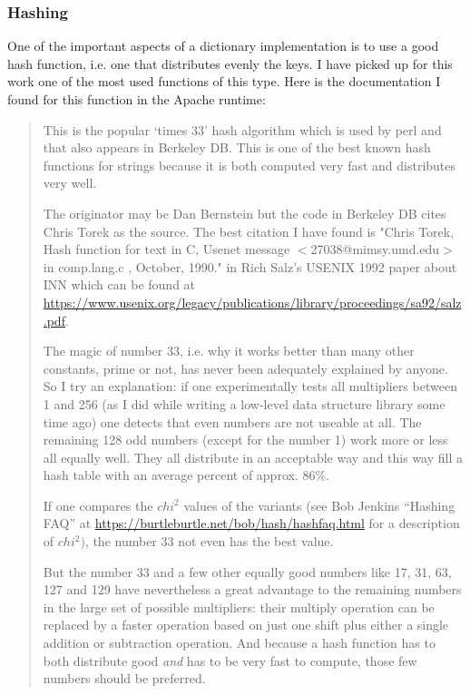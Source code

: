 \documentclass[12pt,a4paper,openany]{memoir} %
\newcommand{\container}{}
\begin{document}
{{\subsubsection{Hashing}
\renewcommand{\container}{hash}
One of the important aspects of a dictionary implementation is to use a good hash function, i.e. one that distributes evenly the keys. I have picked
up for this work one of the most used functions of this type. Here is the documentation I found for this function in the Apache runtime:
\par\indent
\begin{quotation}{
This is the popular `times 33' hash algorithm which is used by perl and that also appears in Berkeley DB. This is one of the best
 known hash functions for strings because it is both computed very fast and distributes very well.
   
 The originator may be Dan Bernstein but the code in Berkeley DB cites Chris Torek as the source. The best citation I have found
 is "Chris Torek, Hash function for text in C, Usenet message  $<$27038@mimsy.umd.edu$>$ in comp.lang.c , October, 1990." in Rich
 Salz's USENIX 1992 paper about INN which can be found at  \url{https://www.usenix.org/legacy/publications/library/proceedings/sa92/salz.pdf}.
\par

    The magic of number 33, i.e. why it works better than many other constants, prime or not, has never been adequately explained by
 anyone. So I try an explanation: if one experimentally tests all  multipliers between 1 and 256 (as I did while writing a low-level
 data structure library some time ago) one detects that even numbers are not useable at all. The remaining 128 odd numbers
 (except for the number 1) work more or less all equally well.  They all distribute in an acceptable way and this way fill a hash
 table with an average percent of approx. 86\%.
 
   If one compares the $chi^{2}$ 
 values of the variants (see Bob Jenkins ``Hashing FAQ'' at \url{https://burtleburtle.net/bob/hash/hashfaq.html} for a description of $chi^{2})$, the number 33 not even has the best value. \par But the
 number 33 and a few other equally good numbers like 17, 31, 63, 127 and 129 have nevertheless a great advantage to the remaining
 numbers in the large set of possible multipliers: their multiply operation can be replaced by a faster operation based on just one
 shift plus either a single addition or subtraction operation. And  because a hash function has to both distribute good \textsl{and} has to
 be very fast to compute, those few numbers should be preferred.


}
\end{quotation}}}
\end{document}
